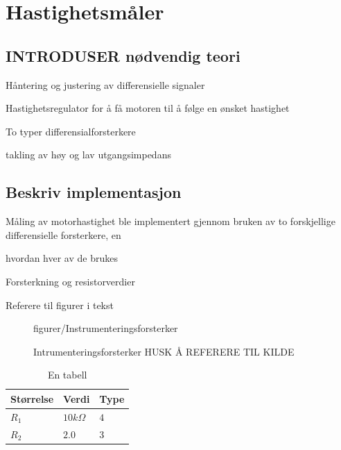 \section{Hastighetsmåler}
\subsection{INTRODUSER nødvendig teori}
Håntering og justering av differensielle signaler

Hastighetsregulator for å få motoren til å følge en ønsket hastighet

To typer differensialforsterkere

takling av høy og lav utgangsimpedans






\subsection{Beskriv implementasjon}
Måling av motorhastighet ble implementert gjennom bruken av to forskjellige differensielle forsterkere, en 

hvordan hver av de brukes

Forsterkning og resistorverdier

Referere til figurer i tekst



\begin{figure} [h]
    \centering
     {figurer/Instrumenteringsforsterker}
    \caption{Intrumenteringsforsterker HUSK Å REFERERE TIL KILDE}
    \label{fig:instrumenteringsforsterker}
\end{figure}

\begin{table}[h]
	\centering
	\begin{tabular}{lll} 
		\toprule
		Størrelse & Verdi & Type \\
		\midrule
        $R_1$ & $10k\Omega$ & $4$ \\
        $R_2$ & $2.0$ & $3$\\
        
        
		\bottomrule
	\end{tabular}
    \caption{En tabell}
\label{tab:eksempeltabell}
\end{table}







